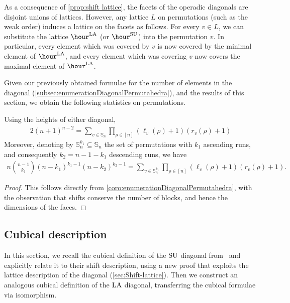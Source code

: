 \begin{remark}
As a consequence of \cref{prop:shift lattice}, the facets of the operadic diagonals are disjoint unions of lattices.
However, any lattice $L$ on permutations (such as the weak order) induces a lattice on the facets as follows.
For every $v \in L$, we can substitute the lattice $\hour^\LA$ (or $\hour^\SU$) into the permutation $v$.
In particular, every element which was covered by $v$ is now covered by the minimal element of $\hour^\LA$, and every element which was covering $v$ now covers the maximal element of $\hour^\LA$.
\end{remark}

Given our previously obtained formulae for the number of elements in the diagonal (\cref{subsec:enumerationDiagonalPermutahedra}), and the results of this section, we obtain the following statistics on permutations.

\begin{corollary}
\label{cor:statistics-lattice}
Using the heights of either diagonal,
\begin{align*}
2(n+1)^{n-2} = \sum_{v \in \mathbb{S}_n} \prod_{\rho \in [n]} (\ell_v(\rho)+1)(r_v(\rho)+1)
\end{align*}
Moreover, denoting by $\mathbb{S}_n^{k_1} \subseteq \mathbb{S}_n$ the set of permutations with $k_1$ ascending runs, and consequently $k_2 = n-1-k_1$ descending runs, we have 
\begin{align*}
n \binom{n-1}{k_1} (n-k_1)^{k_1-1} (n-k_2)^{k_2-1} = \sum_{v \in \mathbb{S}_n^{k_1}} \prod_{\rho \in [n]} (\ell_v(\rho)+1)(r_v(\rho)+1).
\end{align*}
\end{corollary}

\begin{proof}
This follows directly from \cref{coro:enumerationDiagonalPermutahedra}, with the observation that shifts conserve the number of blocks, and hence the dimensions of the faces.
\end{proof}


\subsection{Cubical description}
\label{sec:Cubical}

In this section, we recall the cubical definition of the $\mathrm{SU}$ diagonal from~\cite{SaneblidzeUmble-comparingDiagonals} and explicitly relate it to their shift description, using a new proof that exploits the lattice description of the diagonal (\cref{sec:Shift-lattice}).
Then we construct an analogous cubical definition of the $\mathrm{LA}$ diagonal, transferring the cubical formulae via isomorphism.

